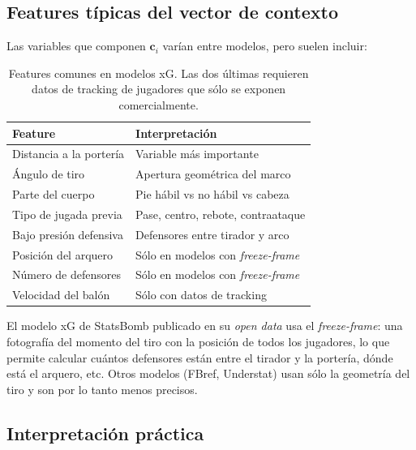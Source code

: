 \subsection{Features típicas del vector de contexto}

Las variables que componen $\mathbf{c}_i$ varían entre modelos, pero suelen incluir:

\begin{table}[h]
\centering
\begin{tabular}{ll}
\toprule
\textbf{Feature} & \textbf{Interpretación} \\
\midrule
Distancia a la portería          & Variable más importante \\
Ángulo de tiro                   & Apertura geométrica del marco \\
Parte del cuerpo                 & Pie hábil vs no hábil vs cabeza \\
Tipo de jugada previa            & Pase, centro, rebote, contraataque \\
Bajo presión defensiva           & Defensores entre tirador y arco \\
Posición del arquero             & Sólo en modelos con \emph{freeze-frame} \\
Número de defensores             & Sólo en modelos con \emph{freeze-frame} \\
Velocidad del balón              & Sólo con datos de tracking \\
\bottomrule
\end{tabular}
\caption{Features comunes en modelos xG. Las dos últimas requieren datos de tracking de jugadores que sólo se exponen comercialmente.}
\end{table}

El modelo xG de StatsBomb publicado en su \emph{open data} usa el \emph{freeze-frame}: una fotografía del momento del tiro con la posición de todos los jugadores, lo que permite calcular cuántos defensores están entre el tirador y la portería, dónde está el arquero, etc. Otros modelos (FBref, Understat) usan sólo la geometría del tiro y son por lo tanto menos precisos.

\subsection{Interpretación práctica}

